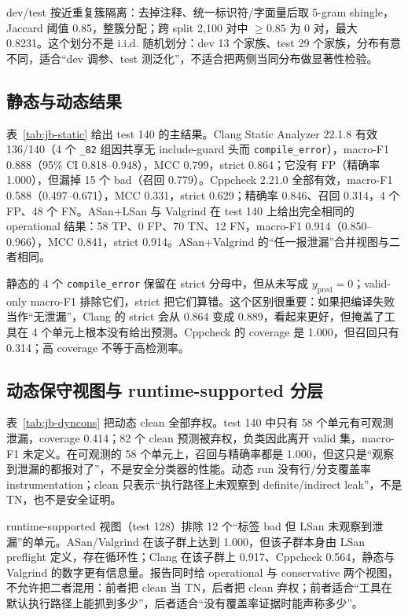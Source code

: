 \documentclass[conference]{IEEEtran}
\begin{document}
dev/test 按近重复簇隔离：去掉注释、统一标识符/字面量后取 5-gram shingle，Jaccard 阈值 0.85，整簇分配；跨 split 2{,}100 对中 $\ge0.85$ 为 0 对，最大 0.8231。这个划分不是 i.i.d. 随机划分：dev 13 个家族、test 29 个家族，分布有意不同，适合“dev 调参、test 测泛化”，不适合把两侧当同分布做显著性检验。



\subsection{静态与动态结果}
表~\ref{tab:jb-static} 给出 test 140 的主结果。Clang Static Analyzer 22.1.8 有效 136/140（4 个 \texttt{\_82} 组因共享无 include-guard 头而 \texttt{compile\_error}），macro-F1 0.888（95\% CI 0.818--0.948），MCC 0.799，strict 0.864；它没有 FP（精确率 1.000），但漏掉 15 个 bad（召回 0.779）。Cppcheck 2.21.0 全部有效，macro-F1 0.588（0.497--0.671），MCC 0.331，strict 0.629；精确率 0.846、召回 0.314，4 个 FP、48 个 FN。ASan+LSan 与 Valgrind 在 test 140 上给出完全相同的 operational 结果：58 TP、0 FP、70 TN、12 FN，macro-F1 0.914（0.850--0.966），MCC 0.841，strict 0.914。ASan+Valgrind 的“任一报泄漏”合并视图与二者相同。

静态的 4 个 \texttt{compile\_error} 保留在 strict 分母中，但从未写成 $y_{\mathrm{pred}}=0$；valid-only macro-F1 排除它们，strict 把它们算错。这个区别很重要：如果把编译失败当作“无泄漏”，Clang 的 strict 会从 0.864 变成 0.889，看起来更好，但掩盖了工具在 4 个单元上根本没有给出预测。Cppcheck 的 coverage 是 1.000，但召回只有 0.314；高 coverage 不等于高检测率。

\subsection{动态保守视图与 runtime-supported 分层}
表~\ref{tab:jb-dyncons} 把动态 clean 全部弃权。test 140 中只有 58 个单元有可观测泄漏，coverage 0.414；82 个 clean 预测被弃权，负类因此离开 valid 集，macro-F1 未定义。在可观测的 58 个单元上，召回与精确率都是 1.000，但这只是“观察到泄漏的都报对了”，不是安全分类器的性能。动态 run 没有行/分支覆盖率 instrumentation；clean 只表示“执行路径上未观察到 definite/indirect leak”，不是 TN，也不是安全证明。

runtime-supported 视图（test 128）排除 12 个“标签 bad 但 LSan 未观察到泄漏”的单元。ASan/Valgrind 在该子群上达到 1.000，但该子群本身由 LSan preflight 定义，存在循环性；Clang 在该子群上 0.917、Cppcheck 0.564，静态与 Valgrind 的数字更有信息量。报告同时给 operational 与 conservative 两个视图，不允许把二者混用：前者把 clean 当 TN，后者把 clean 弃权；前者适合“工具在默认执行路径上能抓到多少”，后者适合“没有覆盖率证据时能声称多少”。
\end{document}
